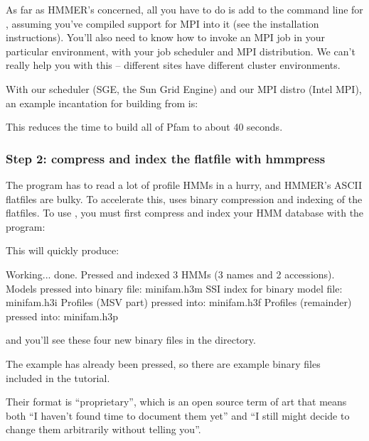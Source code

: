 As far as HMMER's concerned, all you have to do is add  to
the command line for , assuming you've compiled support
for MPI into it (see the installation instructions).  You'll also need
to know how to invoke an MPI job in your particular environment, with
your job scheduler and MPI distribution. We can't really help you with
this -- different sites have different cluster environments.

With our scheduler (SGE, the Sun Grid Engine) and our MPI distro
(Intel MPI), an example incantation for building  from
 is:


This reduces the time to build all of Pfam to about 40 seconds.

\subsubsection{Step 2: compress and index the flatfile with hmmpress}

The  program has to read a lot of profile HMMs in a
hurry, and HMMER's ASCII flatfiles are bulky. To accelerate this,
 uses binary compression and indexing of the flatfiles.
To use , you must first compress and index your HMM
database with the  program:


This will quickly produce:

\begin{sreoutput}
Working...    done.
Pressed and indexed 3 HMMs (3 names and 2 accessions).
Models pressed into binary file:   minifam.h3m
SSI index for binary model file:   minifam.h3i
Profiles (MSV part) pressed into:  minifam.h3f
Profiles (remainder) pressed into: minifam.h3p
\end{sreoutput}

and you'll see these four new binary files in the directory. 

The  example has already been pressed, so there
are example binary files\\
included in the tutorial.

Their format is ``proprietary'', which is an open source term of art
that means both ``I haven't found time to document them yet'' and ``I
still might decide to change them arbitrarily without telling you''.


